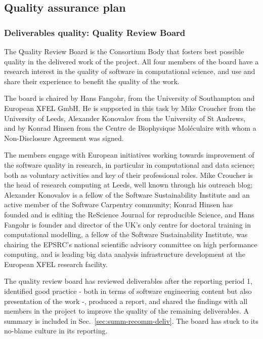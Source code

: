 \subsection{Quality assurance plan}
\label{section.QAP}

\subsubsection{Deliverables quality: Quality Review Board}

The Quality Review Board is the Consortium Body that fosters best
possible quality in the delivered work of the project.
All four members of the board
have a research interest in the quality of software in computational
science, and use and share their experience to benefit the quality of
the work.

The board is chaired by Hans Fangohr, from the University of
Southampton and European XFEL GmbH. He is supported in this task by
Mike Croucher from the University of Leeds, Alexander Konovalov from
the University of St Andrews, and by Konrad Hinsen from the Centre de
Biophysique Moléculaire with whom a Non-Disclosure Agreement was
signed.

The members engage with European initiatives working towards
improvement of the software quality in research, in particular in
computational and data science; both as voluntary activities and key
of their professional roles. Mike Croucher is the head of research
computing at Leeds, well known through his outreach blog; Alexander Konovalov
is a fellow of the Software Sustainability Institute and an active
member of the Software Carpentry community; Konrad Hinsen has
founded and is editing the ReScience Journal for reproducible Science,
and Hans Fangohr is founder and director of the UK's only centre for
doctoral training in computational modelling, a fellow of the Software
Sustainability Institute, was chairing the EPSRC's national scientific
advisory committee on high performance computing, and is leading big
data analysis infrastructure development at the European XFEL research
facility.

The quality review board has reviewed deliverables after the
reporting period 1, identified good practice - both in terms of
software engineering content but also presentation of the work -,
produced a report, and shared the findings with all members in the
project to improve the quality of the remaining deliverables. A
summary is included in Sec.~\ref{sec:summ-recomm-deliv}. The
board has stuck to its no-blame culture in its reporting.

